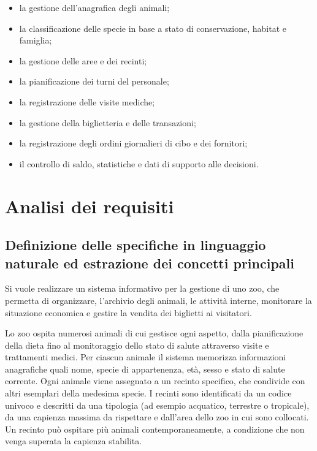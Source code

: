 \documentclass[12pt,a4paper]{report}
\begin{document}
\begin{itemize}[itemsep=2pt]
    \item la gestione dell'anagrafica degli animali;
    \item la classificazione delle specie in base a stato di conservazione, habitat e famiglia;
    \item la gestione delle aree e dei recinti;
    \item la pianificazione dei turni del personale;
    \item la registrazione delle visite mediche;
    \item la gestione della biglietteria e delle transazioni;
    \item la registrazione degli ordini giornalieri di cibo e dei fornitori;
    \item il controllo di saldo, statistiche e dati di supporto alle decisioni.
\end{itemize}

\fi %


\chapter{Analisi dei requisiti}

\section{Definizione delle specifiche in linguaggio naturale ed estrazione dei concetti principali}

Si vuole realizzare un sistema informativo per la gestione di uno zoo, che permetta di organizzare, l’archivio degli animali, le attività interne, monitorare la situazione economica e gestire la vendita dei biglietti ai visitatori. 

Lo zoo ospita numerosi animali di cui gestisce ogni aspetto, dalla pianificazione della dieta fino al monitoraggio dello stato di salute attraverso visite e trattamenti medici. Per ciascun animale il sistema memorizza informazioni anagrafiche quali nome, specie di appartenenza, età, sesso e stato di salute corrente. Ogni animale viene assegnato a un recinto specifico, che condivide con altri esemplari della medesima specie. I recinti sono identificati da un codice univoco e descritti da una tipologia (ad esempio acquatico, terrestre o tropicale), da una capienza massima da rispettare e dall'area dello zoo in cui sono collocati. Un recinto può ospitare più animali contemporaneamente, a condizione che non venga superata la capienza stabilita. 
\end{document}
